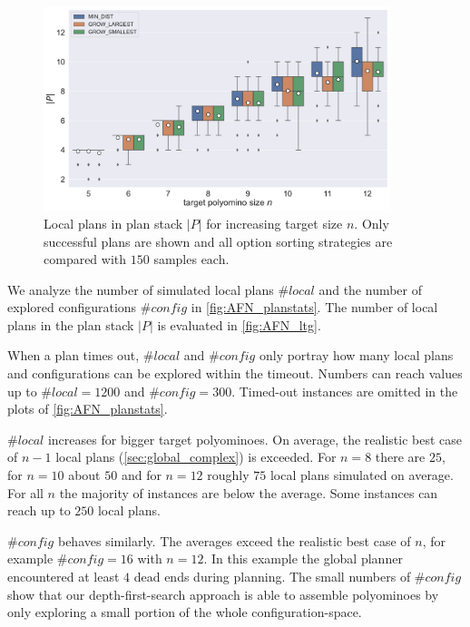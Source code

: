 \begin{figure}
	\centering
	\includegraphics[width=0.9\textwidth]{figures/plots/AFN_ltg.pdf}
	\caption[Local plans in plan stack for increasing target size]{Local plans in plan stack $|P|$ for increasing target size $n$. Only successful plans are shown and all option sorting strategies are compared with $150$ samples each.}
	\label{fig:AFN_ltg}
\end{figure}


We analyze the number of simulated local plans $\#\textit{local}$ and the number of explored configurations $\#\textit{config}$ in \autoref{fig:AFN_planstats}.
The number of local plans in the plan stack $|P|$ is evaluated in \autoref{fig:AFN_ltg}.

When a plan times out, $\#\textit{local}$ and $\#\textit{config}$ only portray how many local plans and configurations can be explored within the timeout.
Numbers can reach values up to $\#\textit{local} = 1200$ and $\#\textit{config} = 300$.
Timed-out instances are omitted in the plots of \autoref{fig:AFN_planstats}.

$\#\textit{local}$ increases for bigger target polyominoes.
On average, the realistic best case of $n-1$ local plans (\autoref{sec:global_complex}) is exceeded.
For $n=8$ there are $25$, for $n=10$ about $50$ and for $n=12$ roughly $75$ local plans simulated on average.
For all $n$ the majority of instances are below the average.
Some instances can reach up to $250$ local plans.

$\#\textit{config}$ behaves similarly.
The averages exceed the realistic best case of $n$, for example $\#\textit{config} = 16$ with $n=12$.
In this example the global planner encountered at least $4$ dead ends during planning.
The small numbers of $\#\textit{config}$ show that our depth-first-search approach is able to assemble polyominoes by only exploring a small portion of the whole configuration-space.


